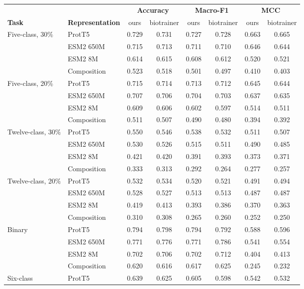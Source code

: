 \begin{tabular}{llcccccc}
\hline
 & & \multicolumn{2}{c}{\textbf{Accuracy}} & \multicolumn{2}{c}{\textbf{Macro-F1}} & \multicolumn{2}{c}{\textbf{MCC}} \\
\textbf{Task} & \textbf{Representation} & ours & biotrainer & ours & biotrainer & ours & biotrainer \\
\hline
Five-class, 30\% & ProtT5 & 0.729 & 0.731 & 0.727 & 0.728 & 0.663 & 0.665 \\
 & ESM2 650M & 0.715 & 0.713 & 0.711 & 0.710 & 0.646 & 0.644 \\
 & ESM2 8M & 0.614 & 0.615 & 0.608 & 0.612 & 0.520 & 0.521 \\
 & Composition & 0.523 & 0.518 & 0.501 & 0.497 & 0.410 & 0.403 \\
\hline
Five-class, 20\% & ProtT5 & 0.715 & 0.714 & 0.713 & 0.712 & 0.645 & 0.644 \\
 & ESM2 650M & 0.707 & 0.706 & 0.704 & 0.703 & 0.637 & 0.635 \\
 & ESM2 8M & 0.609 & 0.606 & 0.602 & 0.597 & 0.514 & 0.511 \\
 & Composition & 0.511 & 0.507 & 0.490 & 0.480 & 0.394 & 0.392 \\
\hline
Twelve-class, 30\% & ProtT5 & 0.550 & 0.546 & 0.538 & 0.532 & 0.511 & 0.507 \\
 & ESM2 650M & 0.530 & 0.526 & 0.515 & 0.511 & 0.490 & 0.485 \\
 & ESM2 8M & 0.421 & 0.420 & 0.391 & 0.393 & 0.373 & 0.371 \\
 & Composition & 0.333 & 0.313 & 0.292 & 0.264 & 0.277 & 0.257 \\
\hline
Twelve-class, 20\% & ProtT5 & 0.532 & 0.534 & 0.520 & 0.521 & 0.491 & 0.494 \\
 & ESM2 650M & 0.528 & 0.527 & 0.513 & 0.513 & 0.487 & 0.487 \\
 & ESM2 8M & 0.419 & 0.413 & 0.393 & 0.386 & 0.370 & 0.363 \\
 & Composition & 0.310 & 0.308 & 0.265 & 0.260 & 0.252 & 0.250 \\
\hline
Binary & ProtT5 & 0.794 & 0.798 & 0.794 & 0.792 & 0.588 & 0.596 \\
 & ESM2 650M & 0.771 & 0.776 & 0.771 & 0.786 & 0.541 & 0.554 \\
 & ESM2 8M & 0.702 & 0.706 & 0.702 & 0.712 & 0.404 & 0.413 \\
 & Composition & 0.620 & 0.616 & 0.617 & 0.625 & 0.245 & 0.232 \\
\hline
Six-class & ProtT5 & 0.639 & 0.625 & 0.605 & 0.598 & 0.542 & 0.532 \\
\hline
\end{tabular}
